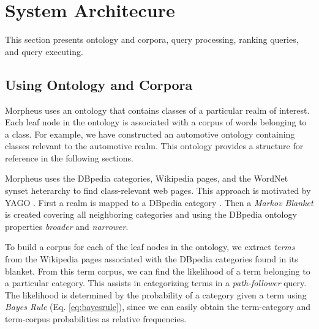 \section{System Architecure}
\label{sec:systemarch}

This section presents ontology and corpora, query processing, ranking queries, and query executing.

\subsection{Using Ontology and Corpora} 
\label{sec:ontology_corpora}

Morpheus uses an ontology that contains classes of a particular realm of interest. Each leaf node in the ontology is associated with a corpus of words belonging to a class.  For example, we have constructed an automotive ontology containing classes relevant to the automotive realm. This ontology provides a structure for reference in the following sections.



Morpheus uses the DBpedia categories, Wikipedia pages, and the WordNet synset heterarchy to find class-relevant web pages. This approach is motivated by YAGO \cite{Suchanek2009phd}. First a realm is mapped to a DBpedia category \cite{Bizer2009}. Then a \emph{Markov Blanket} \cite{PRIS} is created covering all neighboring categories and using the DBpedia ontology properties \emph{broader} and \emph{narrower}.  


To build a corpus for each of the leaf nodes in the ontology, we extract \emph{terms} from the Wikipedia pages associated with the DBpedia categories found in its blanket. From this term corpus, we can find the likelihood of a term belonging to a particular category. This assists in categorizing terms in a \emph{path-follower} query. The likelihood is determined by the probability of a category given a term using \textit{Bayes Rule} (Eq. \ref{eq:bayesrule}), since we can easily obtain the term-category and term-corpus probabilities as relative frequencies. 


